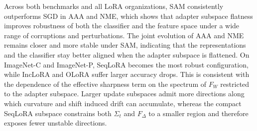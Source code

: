 \documentclass[10pt]{article} %
\begin{document}
Across both benchmarks and all LoRA organizations, SAM consistently outperforms SGD in AAA and NME, which shows that adapter subspace flatness improves robustness of both the classifier and the feature space under a wide range of corruptions and perturbations. The joint evolution of AAA and NME remains closer and more stable under SAM, indicating that the representations and the classifier stay better aligned when the adapter subspace is flattened.
On ImageNet-C and ImageNet-P, SeqLoRA becomes the most robust configuration, while IncLoRA and OLoRA suffer larger accuracy drops. This is consistent with the dependence of the effective sharpness term on the spectrum of $F_W$ restricted to the adapter subspace. Larger update subspaces admit more directions along which curvature and shift induced drift can accumulate, whereas the compact SeqLoRA subspace constrains both $\Sigma_t$ and $F_\Delta$ to a smaller region and therefore exposes fewer unstable directions. 







\end{document}
